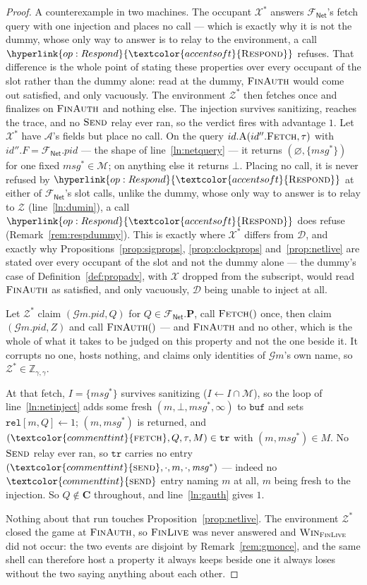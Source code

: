 \documentclass[10pt,oneside,openany]{book}
\newcommand{\Ps}{\mathbf{P}}
\newcommand{\PID}{\mathit{pid}}
\renewcommand{\emptyset}{\varnothing}
\newcommand{\Cs}{\mathbf{C}}
\newcommand{\Zenv}{\mathcal{Z}}
\newcommand{\Adv}{\mathcal{A}}
\newcommand{\Dum}{\mathcal{D}}
\newcommand{\ZenvSet}{\mathbb{Z}}
\newcommand{\op}[1]{\textnormal{\textsc{#1}}}
\newcommand{\opl}[1]{\hyperlink{op:#1}{\textcolor{accentsoft}{\op{#1}}}}
\newcommand{\id}{id}
\newcommand{\atom}[1]{\textcolor{commenttint}{\op{#1}}}
\newcommand{\Gm}{\mathcal{G}m}
\newcommand{\Win}{\op{Win}}
\newcommand{\Fnet}{\mathcal{F}_{\mathsf{Net}}}
\newcommand{\msg}{\mathit{msg}}
\newcommand{\Msgs}{\mathcal{M}}
\newcommand{\none}{\bot}
\newcommand{\V}[1]{\mathtt{#1}}
\theoremstyle{accentdef}
\theoremstyle{accentplain}
\begin{document}
\begin{proof}
A counterexample in two machines. The occupant $\mathcal{X}^{*}$ answers $\Fnet$'s fetch query with
one injection and places no call --- which is exactly why it is not the dummy, whose only way to
answer is to relay to the environment, a call $\opl{Respond}$ refuses. That difference is the whole
point of stating these properties over every occupant of the slot rather than the dummy alone: read
at the dummy, $\op{FinAuth}$ would come out satisfied, and only vacuously. The environment
$\Zenv^{*}$ then fetches once and finalizes on $\op{FinAuth}$ and nothing else. The injection
survives sanitizing, reaches the trace, and no $\op{Send}$ relay ever ran, so the verdict fires with
advantage $1$.
Let $\mathcal{X}^{*}$ have $\Adv$'s fields but place no call. On the query
$\id.\op{A}(\id''.\op{Fetch},\tau)$ with $\id''.F = \Fnet.\PID$ --- the shape of
line~\ref{ln:netquery} --- it returns $(\emptyset,\{\msg^{*}\})$ for one fixed $\msg^{*} \in
\Msgs$; on anything else it returns $\none$. Placing no call, it is never refused by
$\opl{Respond}$ at either of $\Fnet$'s slot calls, unlike the dummy, whose only way to answer is
to relay to $\Zenv$
(line~\ref{ln:dumin}), a call $\opl{Respond}$ does refuse (Remark~\ref{rem:respdummy}). This is
exactly where $\mathcal{X}^{*}$ differs from $\Dum$, and exactly why
Propositions~\ref{prop:sigprops}, \ref{prop:clockprops} and~\ref{prop:netlive} are stated over
every occupant of the slot and not the dummy alone --- the dummy's case
of Definition~\ref{def:propadv}, with $\mathcal{X}$ dropped from the subscript, would read
$\op{FinAuth}$ as satisfied, and only vacuously,
$\Dum$ being unable to inject at all.

Let $\Zenv^{*}$ claim $(\Gm.\PID,Q)$ for $Q \in \Fnet.\Ps$, call $\op{Fetch}()$ once, then claim
$(\Gm.\PID,Z)$ and call $\op{FinAuth}()$ --- and $\op{FinAuth}$ and no other, which is the
whole of what it takes to be judged on this property and not the one beside it. It corrupts no
one, hosts nothing, and claims only
identities of $\Gm$'s own name, so $\Zenv^{*} \in \ZenvSet_{\gamma,\gamma}$.

At that fetch, $I = \{\msg^{*}\}$ survives sanitizing ($I \gets I \cap \Msgs$), so the loop of
line~\ref{ln:netinject} adds some fresh $(m,\none,\msg^{*},\infty)$ to $\V{buf}$ and sets
$\V{rel}[m,Q] \gets 1$; $(m,\msg^{*})$ is returned, and $(\atom{fetch},Q,\tau,M) \in \V{tr}$ with
$(m,\msg^{*}) \in M$. No $\op{Send}$ relay ever ran, so $\V{tr}$ carries no entry
$(\atom{send},\cdot,m,\cdot,\msg^{*})$ --- indeed no $\atom{send}$ entry naming $m$ at all, $m$ being
fresh to the injection. So $Q \notin \Cs$ throughout, and line~\ref{ln:gauth} gives $1$.

Nothing about that run touches Proposition~\ref{prop:netlive}. The environment $\Zenv^{*}$ closed the game at
$\op{FinAuth}$, so $\op{FinLive}$ was never answered and $\Win_{\op{FinLive}}$ did not occur:
the two events are disjoint by Remark~\ref{rem:gmonce}, and the same shell can therefore host a
property it always keeps beside one it always loses without the two saying anything about each
other.
\end{proof}
\end{document}
